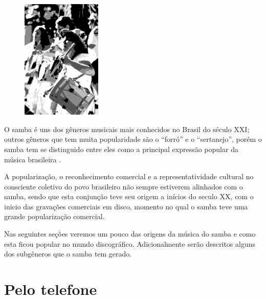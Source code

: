 \noindent 
\begin{minipage}{\textwidth}
\begin{figure}
    \centering
    \vspace{-13pt}
    \includegraphics[width=0.34\textwidth]{chapters/cap-historia-musicasamba/DSC_0044-4-efeitoimagem-envelhecer.eps}
\end{figure}
\hspace{0.75cm} O samba é uns dos gêneros musicais mais conhecidos no Brasil do século XXI;
outros gêneros que tem muita popularidade são o ``forró'' e o ``sertanejo'', porém
o samba tem se distinguido entre eles
como a principal expressão popular da música brasileira \cite[pp. 47]{diniz2008almanaque}.

A popularização, o reconhecimento comercial e a representatividade cultural no consciente coletivo do povo brasileiro
não sempre estiverem alinhados com o samba, 
sendo que esta conjunção teve seu origem a inícios do seculo XX, 
com o inicio das gravações comerciais em disco, 
momento no qual o samba teve uma grande popularização comercial.

Nas seguintes seções veremos um pouco das origens da música do samba e como
esta ficou popular no mundo discográfico. 
Adicionalmente serão descritos alguns dos subgêneros que o samba tem gerado.
\end{minipage}

\section{Pelo telefone}

